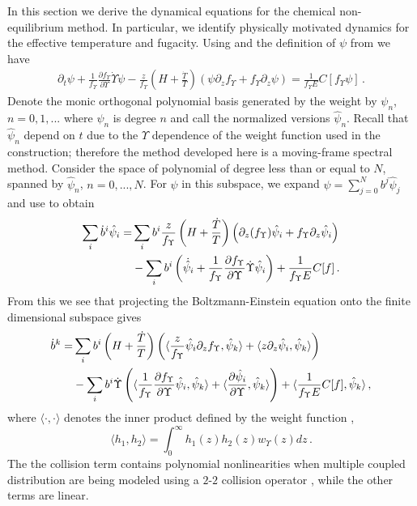 \label{dynamics_sec}
In this section we derive the dynamical equations for the chemical non-equilibrium method.  In particular, we identify physically motivated dynamics for the effective temperature and fugacity.  Using  and the definition of $\psi$ from  we have
\begin{align}\label{near_equilib_eq}
\partial_t \psi+\frac{1}{f_\Upsilon }\frac{\partial f_\Upsilon }{\partial\Upsilon}\dot\Upsilon\psi-\frac{z}{f_\Upsilon }\left(H+\frac{\dot{T}}{T}\right)\left(\psi\partial_zf_\Upsilon +f_\Upsilon \partial_z \psi\right)=\frac{1}{f_\Upsilon E}C[f_\Upsilon \psi]\,.
\end{align}
Denote the monic orthogonal polynomial basis generated by the weight  by $\psi_n$, $n=0,1,...$ where $\psi_n$ is degree $n$ and call the normalized versions  $\hat{\psi}_n$. Recall that $\hat\psi_n$ depend on $t$ due to the $\Upsilon$ dependence of the weight function used in the construction; therefore the method developed here is a moving-frame spectral method. Consider the space of polynomial of degree less than or equal to $N$, spanned by $\hat\psi_n$, $n=0,...,N$.   For $\psi$ in this subspace, we expand $\psi=\sum_{j=0}^Nb^j\hat\psi_j$ and use   to obtain
\begin{align}\label{T_vars}
\sum_i \dot{b}^i\hat\psi_i=&\sum_ib^i\frac{z}{f_\Upsilon }\left(H+\frac{\dot{T}}{T}\right)\left(\partial_z(f_\Upsilon )\hat\psi_i+f_\Upsilon \partial_z\hat\psi_i\right)\\
&-\sum_ib^i\left(\dot{\hat{\psi}}_i+\frac{1}{f_\Upsilon }\frac{\partial f_\Upsilon }{\partial\Upsilon}\dot\Upsilon\hat\psi_i\right)+\frac{1}{f_\Upsilon E}C[f]\,.
\notag
\end{align}
From this we see  that  projecting the Boltzmann-Einstein equation onto the finite dimensional subspace gives
\begin{align}
\dot b^k=& \sum_i b^i\left(H+\frac{\dot{T}}{T}\right)\left(\langle\frac{z}{f_\Upsilon }\hat\psi_i\partial_zf_\Upsilon ,\hat\psi_k\rangle+\langle z\partial_z \hat\psi_i,\hat\psi_k\rangle\right) \\
&-\sum_i b^i\dot{\Upsilon}\left(\langle\frac{1}{f_\Upsilon }\frac{\partial f_\Upsilon }{\partial\Upsilon}\hat\psi_i,\hat\psi_k\rangle+\langle\frac{\partial\hat{\psi}_i}{\partial \Upsilon},\hat\psi_k\rangle\right)+\langle\frac{1}{f_\Upsilon E}C[f],\hat\psi_k\rangle\notag\,,
\end{align}
where $\langle\cdot,\cdot\rangle$ denotes the inner product defined by the weight function ,
\begin{equation}
\langle h_1,h_2\rangle=\int_0^\infty h_1(z)h_2(z)w_\Upsilon(z)dz\,.
\end{equation}
The the collision term contains polynomial nonlinearities when multiple coupled distribution are being modeled using a $2$-$2$ collision operator , while the other terms are linear.  

